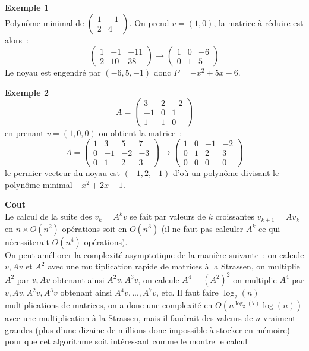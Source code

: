\documentclass[a4paper,11pt]{book}
\begin{document}
\begin{giacjshere}
{\bf Exemple 1}\\
Polynôme minimal de $\left(\begin{array}{cc} 1 & -1 \\ 2 & 4
\end{array}\right) $. On prend $v=(1,0)$, la matrice à réduire est
alors~:
\[ \left(\begin{array}{ccc} 1 & -1 & -11 \\ 2 & 10 & 38
\end{array}\right) \rightarrow 
\left(\begin{array}{ccc} 1 & 0 & -6 \\ 0 & 1 & 5
\end{array}\right)
\]
Le noyau est engendré par $(-6,5,-1)$ donc $P=-x^2+5x-6$.

{\bf Exemple 2}\\
\[ A=\left(\begin{array}{ccc}
 3 & 2 & -2 \\
-1 &0 &1 \\
1 & 1 & 0 
\end{array}\right) \]
en prenant $v=(1,0,0)$ on obtient la matrice~:
\[ A=\left(\begin{array}{cccc}
1 & 3 & 5 & 7 \\
0 & -1 & -2 & -3 \\
0 & 1 & 2 & 3
\end{array}\right) \rightarrow
\left(\begin{array}{cccc}
1 & 0 & -1 & -2 \\
0 & 1 & 2 & 3 \\
0 & 0 & 0 & 0 
\end{array}\right) \]
le permier vecteur du noyau est $(-1,2,-1)$ d'où un polynôme divisant
le polynôme minimal $-x^2+2x-1$.

{\bf Cout}\\
Le calcul de la suite des $v_k=A^kv$ se fait par valeurs de $k$ croissantes 
$v_{k+1}=Av_k$ en $n \times O(n^2)$ op\'erations soit en $O(n^3)$
(il ne faut pas calculer $A^k$ ce qui n\'ecessiterait $O(n^4)$
op\'erations).\\
On peut am\'eliorer la complexit\'e asymptotique de la mani\`ere 
suivante~: on calcule $v, Av$ et $A^2$ avec une multiplication rapide
de matrices \`a la Strassen, on multiplie $A^2$ par $v,Av$ obtenant ainsi
$A^2v, A^3v$, on calcule $A^4=(A^2)^2$ on multiplie $A^4$ par $v,Av,A^2v,A^3v$
obtenant ainsi $A^4v,...,A^7v$, etc. Il
faut faire $\log_2(n)$ multiplications de matrices, 
on a donc une complexit\'e en $O(n^{\log_2(7)}\log(n))$ avec une 
multiplication \`a la Strassen, mais il 
faudrait des valeurs de $n$ vraiment grandes (plus d'une dizaine
de millions donc impossible \`a stocker en m\'emoire)
pour que cet algorithme soit int\'eressant comme le montre le calcul



\end{giacjshere}
\end{document}
